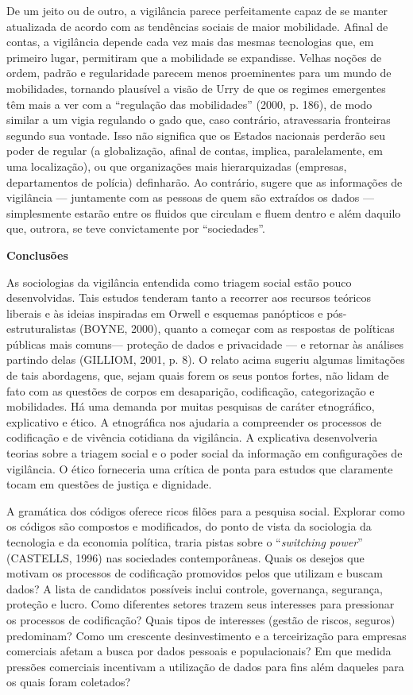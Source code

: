 De um jeito ou de outro, a vigilância parece perfeitamente capaz de se
manter atualizada de acordo com as tendências sociais de maior
mobilidade. Afinal de contas, a vigilância depende cada vez mais das
mesmas tecnologias que, em primeiro lugar, permitiram que a mobilidade
se expandisse. Velhas noções de ordem, padrão e regularidade parecem
menos proeminentes para um mundo de mobilidades, tornando plausível a
visão de Urry de que os regimes emergentes têm mais a ver com a
``regulação das mobilidades'' (2000, p. 186), de modo similar a um vigia
regulando o gado que, caso contrário, atravessaria fronteiras segundo
sua vontade. Isso não significa que os Estados nacionais perderão seu
poder de regular (a globalização, afinal de contas, implica,
paralelamente, em uma localização), ou que organizações mais
hierarquizadas (empresas, departamentos de polícia) definharão. Ao
contrário, sugere que as informações de vigilância --- juntamente com as
pessoas de quem são extraídos os dados --- simplesmente estarão entre os
fluidos que circulam e fluem dentro e além daquilo que, outrora, se teve
convictamente por ``sociedades''.

\textbf{Conclusões}

As sociologias da vigilância entendida como triagem social estão pouco
desenvolvidas. Tais estudos tenderam tanto a recorrer aos recursos
teóricos liberais e às ideias inspiradas em Orwell e esquemas panópticos
e pós-estruturalistas (BOYNE, 2000), quanto a começar com as respostas
de políticas públicas mais comuns--- proteção de dados e privacidade ---
e retornar às análises partindo delas (GILLIOM, 2001, p. 8). O relato
acima sugeriu algumas limitações de tais abordagens, que, sejam quais
forem os seus pontos fortes, não lidam de fato com as questões de corpos
em desaparição, codificação, categorização e mobilidades. Há uma demanda
por muitas pesquisas de caráter etnográfico, explicativo e ético. A
etnográfica nos ajudaria a compreender os processos de codificação e de
vivência cotidiana da vigilância. A explicativa desenvolveria teorias
sobre a triagem social e o poder social da informação em configurações
de vigilância. O ético forneceria uma crítica de ponta para estudos que
claramente tocam em questões de justiça e dignidade.

A gramática dos códigos oferece ricos filões para a pesquisa social.
Explorar como os códigos são compostos e modificados, do ponto de vista
da sociologia da tecnologia e da economia política, traria pistas sobre
o ``\emph{switching power}'' (CASTELLS, 1996) nas sociedades
contemporâneas. Quais os desejos que motivam os processos de codificação
promovidos pelos que utilizam e buscam dados? A lista de candidatos
possíveis inclui controle, governança, segurança, proteção e lucro. Como
diferentes setores trazem seus interesses para pressionar os processos
de codificação? Quais tipos de interesses (gestão de riscos, seguros)
predominam? Como um crescente desinvestimento e a terceirização para
empresas comerciais afetam a busca por dados pessoais e populacionais?
Em que medida pressões comerciais incentivam a utilização de dados para
fins além daqueles para os quais foram coletados?

